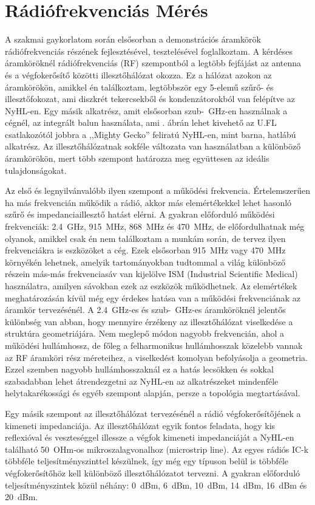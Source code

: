 \documentclass[a4paper,12pt,titlepage]{article}
\begin{document}
    \section{Rádiófrekvenciás Mérés}
        A szakmai gaykorlatom során elsősorban a demonstrációs áramkörök rádiófrekvenciás részének fejlesztésével, tesztelésével foglalkoztam. A kérdéses áramköröknél rádiófrekvenciás (RF) szempontból a legtöbb fejfájást az antenna és a végfokerősítő közötti illesztőhálózat okozza. Ez a hálózat azokon az áramkörökön, amikkel én találkoztam, legtöbbször egy 5-elemű szűrő- és illesztőfokozat, ami diszkrét tekercsekből és kondenzátorokból van felépítve az NyHL-en. Egy másik alkatrész, amit elsősorban szub-\SI{}{GHz}-en használnak a cégnél, az integrált balun használata, ami . ábrán lehet kivehető az U.FL csatlakozótól jobbra a ,,Mighty Gecko'' feliratú NyHL-en, mint barna, hatlábú alkatrész. Az illesztőhálózatnak sokféle változata van használatban a különböző áramkörökön, mert több szempont határozza meg együttesen az ideális tulajdonságokat.
        \par
        Az első és legnyilvánvalóbb ilyen szempont a működési frekvencia. Értelemszerűen ha más frekvencián működik a rádió, akkor más elemértékekkel lehet hasonló szűrő és impedanciaillesztő hatást elérni. A gyakran előforduló működési frekvenciák: \SI{2,4}{GHz}, \SI{915}{MHz}, \SI{868}{MHz} és \SI{470}{MHz}, de előfordulhatnak még olyanok, amikkel csak én nem találkoztam a munkám során, de tervez ilyen frekvenciákra is eszközöket a cég. Ezek elsősorban \SI{915}{MHz} vagy \SI{470}{MHz} környékén lehetnek, amelyik tartományokban tudtommal a világ különböző részein más-más frekvenciasáv van kijelölve ISM (Industrial Scientific Medical) használatra, amilyen sávokban ezek az eszközök működhetnek. Az elemértékek meghatározásán kívül még egy érdekes hatása van a működési frekvenciának az áramkör tervezésénél. A \SI{2,4}{GHz}-es és szub-\SI{}{GHz}-es áramköröknél jelentős különbség van abban, hogy mennyire érzékeny az illesztőhálózat viselkedése a struktúra geometriájára. Nem meglepő módon nagyobb frekvencián, ahol a működési hullámhossz, de főleg a felharmonikus hullámhosszak közelebb vannak az RF áramköri rész méreteihez, a viselkedést komolyan befolyásolja a geometria. Ezzel szemben nagyobb hullámhosszaknál ez a hatás lecsökken és sokkal szabadabban lehet átrendezgetni az NyHL-en az alkatrészeket mindenféle helytakarékossági és egyéb szempont alapján, persze a topológia megtartásával.
        \par
        Egy másik szempont az illesztőhálózat tervezésénél a rádió végfokerősítőjének a kimeneti impedanciája. Az illesztőhálózat egyik fontos feladata, hogy kis reflexióval és veszteséggel illessze a végfok kimeneti impedanciáját a NyHL-en található \SI{50}{OHm}-os mikroszalagvonalhoz (microstrip line). Az egyes rádiós IC-k többféle teljesítményszinttel készülnek, így még egy típuson belül is többféle végfokerősítőhöz kell különböző illesztőhálózatot tervezni. A gyakran előforduló teljesítményszintek közül néhány: \SI{0}{dBm}, \SI{6}{dBm}, \SI{10}{dBm}, \SI{14}{dBm}, \SI{16}{dBm} és \SI{20}{dBm}.
\end{document}
